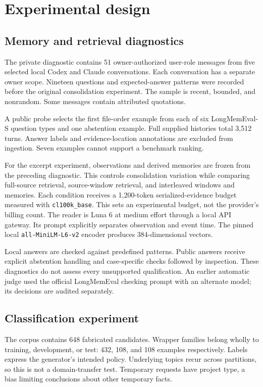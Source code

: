 \documentclass[11pt]{article}
\begin{document}
\section{Experimental design}
\subsection{Memory and retrieval diagnostics}
The private diagnostic contains 51 owner-authorized user-role messages from five selected local Codex and Claude conversations. Each conversation has a separate owner scope. Nineteen questions and expected-answer patterns were recorded before the original consolidation experiment. The sample is recent, bounded, and nonrandom. Some messages contain attributed quotations.

A public probe selects the first file-order example from each of six LongMemEval-S question types and one abstention example. Full supplied histories total 3,512 turns. Answer labels and evidence-location annotations are excluded from ingestion. Seven examples cannot support a benchmark ranking.

For the excerpt experiment, observations and derived memories are frozen from the preceding diagnostic. This controls consolidation variation while comparing full-source retrieval, source-window retrieval, and interleaved windows and memories. Each condition receives a 1,200-token serialized-evidence budget measured with \texttt{cl100k\_base}. This sets an experimental budget, not the provider's billing count. The reader is Luna 6 at medium effort through a local API gateway. Its prompt explicitly separates observation and event time. The pinned local \texttt{all-MiniLM-L6-v2} encoder produces 384-dimensional vectors.

Local answers are checked against predefined patterns. Public answers receive explicit abstention handling and case-specific checks followed by inspection. These diagnostics do not assess every unsupported qualification. An earlier automatic judge used the official LongMemEval checking prompt with an alternate model; its decisions are audited separately.

\subsection{Classification experiment}
The corpus contains 648 fabricated candidates. Wrapper families belong wholly to training, development, or test: 432, 108, and 108 examples respectively. Labels express the generator's intended policy. Underlying topics recur across partitions, so this is not a domain-transfer test. Temporary requests have project type, a bias limiting conclusions about other temporary facts.
\end{document}
